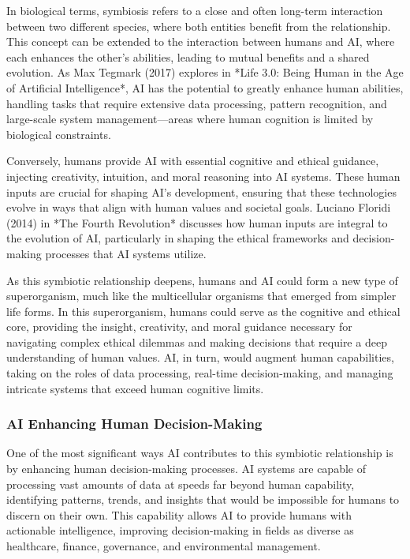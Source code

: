 \documentclass[12pt,twoside]{article}
\begin{document}
In biological terms, symbiosis refers to a close and often long-term interaction between two different species, where both entities benefit from the relationship. This concept can be extended to the interaction between humans and AI, where each enhances the other’s abilities, leading to mutual benefits and a shared evolution. As Max Tegmark (2017) explores in *Life 3.0: Being Human in the Age of Artificial Intelligence*, AI has the potential to greatly enhance human abilities, handling tasks that require extensive data processing, pattern recognition, and large-scale system management—areas where human cognition is limited by biological constraints.

Conversely, humans provide AI with essential cognitive and ethical guidance, injecting creativity, intuition, and moral reasoning into AI systems. These human inputs are crucial for shaping AI’s development, ensuring that these technologies evolve in ways that align with human values and societal goals. Luciano Floridi (2014) in *The Fourth Revolution* discusses how human inputs are integral to the evolution of AI, particularly in shaping the ethical frameworks and decision-making processes that AI systems utilize.

As this symbiotic relationship deepens, humans and AI could form a new type of superorganism, much like the multicellular organisms that emerged from simpler life forms. In this superorganism, humans could serve as the cognitive and ethical core, providing the insight, creativity, and moral guidance necessary for navigating complex ethical dilemmas and making decisions that require a deep understanding of human values. AI, in turn, would augment human capabilities, taking on the roles of data processing, real-time decision-making, and managing intricate systems that exceed human cognitive limits.

\subsubsection{AI Enhancing Human Decision-Making}

One of the most significant ways AI contributes to this symbiotic relationship is by enhancing human decision-making processes. AI systems are capable of processing vast amounts of data at speeds far beyond human capability, identifying patterns, trends, and insights that would be impossible for humans to discern on their own. This capability allows AI to provide humans with actionable intelligence, improving decision-making in fields as diverse as healthcare, finance, governance, and environmental management.
\end{document}
